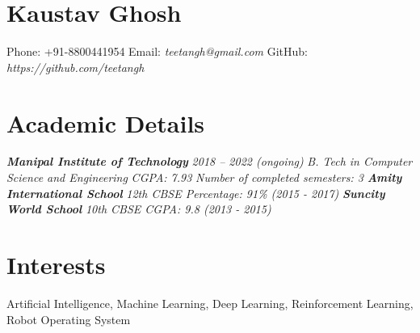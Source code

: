 \documentclass[a4paper,12pt]{article}
\begin{document}
    
    \section*{\LARGE{Kaustav Ghosh}}
    Phone: +91-8800441954
    \newline
    Email: \textit{teetangh@gmail.com}
    \newline
    GitHub: \textit{https://github.com/teetangh}

        

    \section*{Academic Details}
    \textbf{\emph{Manipal Institute of Technology}}
    \newline
    \textit{2018 – 2022 (ongoing)}
    \newline
    \textit{B. Tech in Computer Science and Engineering}
    \newline
    \textit{CGPA: 7.93}
    \newline
    \textit{Number of completed semesters: 3}
    \newline
    \textbf{\emph{Amity International School}}
    \newline
    \textit{12th CBSE Percentage: 91\% (2015 - 2017)}
    \newline
    \textbf{\emph{Suncity World School}}
    \newline
    \textit{10th CBSE CGPA: 9.8 (2013 - 2015)}

    \section*{Interests}
    Artificial Intelligence,
    Machine Learning,
    Deep Learning,
    Reinforcement Learning,
    Robot Operating System
\end{document}
